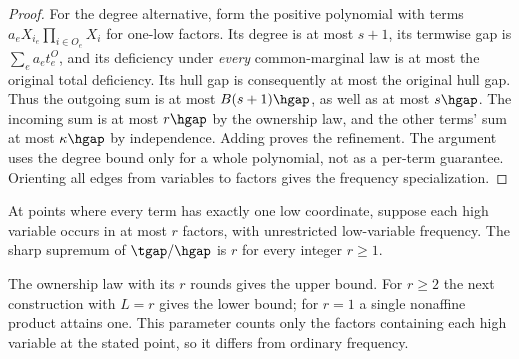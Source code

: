 \begin{proof}
For the degree alternative, form the positive polynomial with terms
$a_eX_{i_e}\prod_{i\in O_e}X_i$ for one-low factors. Its degree is at most
$s+1$, its termwise gap is $\sum_e a_et_e^O$, and its deficiency under
\emph{every} common-marginal law is at most the original total deficiency.
Its hull gap is consequently at most the original hull gap. Thus the
outgoing sum is at most $B(s+1)\hgap$, as well as at most $s\hgap$.
The incoming sum is at most $r\hgap$ by the ownership law, and the other
terms' sum at most $\kappa\hgap$ by independence. Adding proves the
refinement. The argument uses the degree bound only for a whole polynomial,
not as a
per-term guarantee. Orienting all edges
from variables to factors gives the frequency specialization.
\end{proof}

\begin{corollary}\label{cor:ownership-sharp}
At points where every term has exactly one low coordinate, suppose each
high variable occurs in at most $r$ factors, with unrestricted low-variable
frequency. The sharp supremum of $\tgap/\hgap$ is $r$ for every integer
$r\ge1$.
\end{corollary}
The ownership law with its $r$ rounds gives the upper bound. For $r\ge2$
the next construction with $L=r$ gives the lower bound; for $r=1$ a single
nonaffine product attains one. This parameter counts only the factors
containing each high variable at the stated point, so it differs from
ordinary frequency.


